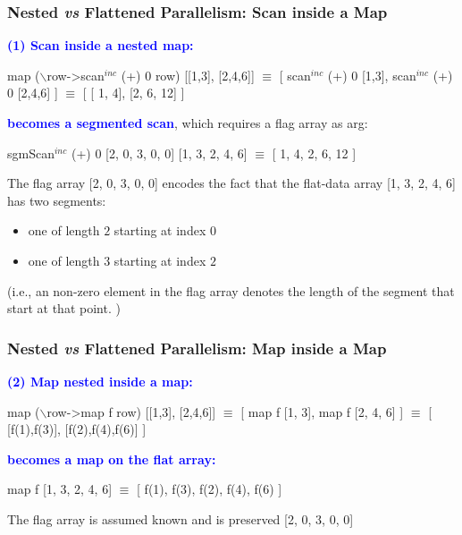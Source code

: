\documentclass{beamer}
\newcommand{\blue}[1]{\textcolor{Blue}{{#1}}}
\renewcommand{\emph}[1]{\textcolor{structure}{#1}}
\newcommand{\emp}[1]{\textcolor{DikuRed}{ #1}}
\newcommand{\mymath}[1]{$ #1 $}
\newcommand{\myindu}[1]{^{#1}}
\begin{document}
\begin{frame}[fragile,t]
  \frametitle{Nested {\it vs} Flattened Parallelism: Scan inside a Map}

\blue{\bf (1) Scan inside a nested map:}

\begin{colorcode}[fontsize=\scriptsize]
map (\mymath{\backslash}row->scan\mymath{\myindu{inc}} (+) 0 row) \emp{[[1,3], [2,4,6]]} 
\mymath{\equiv}
[ scan\mymath{\myindu{inc}} (+) 0 [1,3],    scan\mymath{\myindu{inc}} (+) 0 [2,4,6] ] 
\mymath{\equiv}
\emp{[ [ 1, 4],               [2, 6, 12] ]}
\end{colorcode}

\bigskip
\pause

\blue{\bf becomes a segmented scan}, which requires a flag array as arg:
\bigskip

\begin{colorcode}[fontsize=\scriptsize]
sgmScan\mymath{\myindu{inc}} (+) 0 \emph{[2, 0, 3, 0, 0]} \emph{[1, 3, 2, 4, 6]} \mymath{\equiv} \emph{[ 1, 4, 2, 6, 12 ]}
\end{colorcode}

\bigskip

The flag array \emph{[2, 0, 3, 0, 0]} encodes the fact that the 
flat-data array \emph{[1, 3, 2, 4, 6]} has two segments:
\begin{itemize} 
    \item one of length $2$ starting at index $0$
    \item one of length $3$ starting at index $2$
\end{itemize}

(i.e., an non-zero element in the flag array denotes the 
       length of the segment that start at that point.  )

\end{frame}

\begin{frame}[fragile,t]
  \frametitle{Nested {\it vs} Flattened Parallelism: Map inside a Map}

\blue{\bf (2) Map nested inside a map:}

\begin{colorcode}[fontsize=\scriptsize]
map (\mymath{\backslash}row->map f row) \emp{[[1,3], [2,4,6]]} 
\mymath{\equiv}
[ map f [1, 3],      map f [2, 4, 6] ] 
\mymath{\equiv}
\emp{[ [f(1),f(3)], [f(2),f(4),f(6)] ]}
\end{colorcode}

\bigskip
\pause

\blue{\bf becomes a map on the flat array:}
\bigskip

\begin{colorcode}[fontsize=\scriptsize]
map f \emph{[1, 3, 2, 4, 6]} \mymath{\equiv} \emph{[ f(1), f(3), f(2), f(4), f(6) ]}
\end{colorcode}

\bigskip

The flag array is assumed known and is preserved \emph{[2, 0, 3, 0, 0]}

\end{frame}
\end{document}
